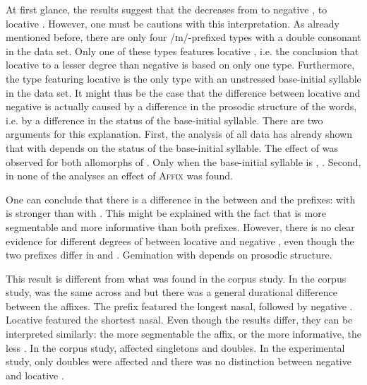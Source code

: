 At first glance, the results suggest that the  decreases from  to negative , to locative .  However, one must be cautions with this interpretation. As already mentioned before, there are only four /ɪn/-prefixed types with a double consonant in the data set. Only one of these types features locative , i.e. the conclusion that locative   to a lesser degree than negative  is based on only one type. Furthermore, the type featuring locative  is the only type with an unstressed base-initial syllable in the data set. 
It might thus be the case that the difference between locative and negative  is actually caused by a difference in the prosodic structure of the words, i.e. by a difference in the  status of the base-initial syllable. There are two arguments for this explanation. First, the analysis of all data has already shown that  with  depends on the  status of the base-initial syllable. The effect of  was observed for both allomorphs of  . Only when the base-initial syllable is ,  . 
 Second, in none of the analyses an effect of \textsc{Affix} was found. 


One can conclude that there is a difference in the  between  and the prefixes:  with  is stronger than  with . This might be explained with the fact that  is more segmentable and more informative than both prefixes. However, there is no clear evidence for different degrees of  between  locative  and negative , even though the two prefixes differ in  and . Gemination with  depends on prosodic structure.

 This result is different from what was found in the corpus study. In the corpus study,  was the same across  and  but there was a general durational difference between the affixes. The prefix  featured the longest nasal, followed by negative . Locative  featured the shortest nasal. 
Even though the results differ, they can be interpreted similarly: the more segmentable the affix, or the more informative, the less . In the corpus study,   affected singletons and doubles. In the experimental study, only doubles were affected and there was no distinction between negative and locative .







